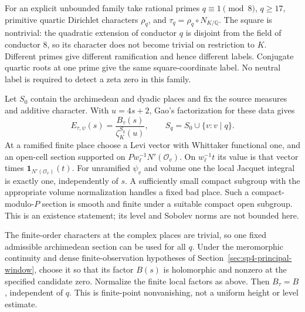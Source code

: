 For an explicit unbounded family take rational primes \(q\equiv1\pmod8\),
\(q\ge17\), primitive quartic Dirichlet characters \(\rho_q\), and
\(\tau_q=\rho_q\circ N_{K/\mathbb Q}\). The square is nontrivial:
the quadratic extension of conductor \(q\) is disjoint from the field
of conductor \(8\), so its character does not become trivial on
restriction to \(K\). Different primes give different ramification
and hence different labels. Conjugate quartic roots at one prime
give the same square-coordinate label. No neutral label is required
to detect a zeta zero in this family.

Let \(S_0\) contain the archimedean and dyadic places and fix the
source measures and additive character. With \(u=4s+2\), Gao's
factorization for these data gives
\[
 E_{\tau,\psi}(s)=\frac{B_\tau(s)}{\zeta_K^{S_q}(u)},
 \qquad S_q=S_0\cup\{v:v\mid q\}.
\]
At a ramified finite place choose a Levi vector with Whittaker
functional one, and an open-cell section supported on
\(P w_\ell^{-1}N'(\mathcal O_v)\). On \(w_\ell^{-1}t\) its value
is that vector times \(\mathbf1_{N'(\mathcal O_v)}(t)\).
For unramified \(\psi_v\) and volume one the local Jacquet integral
is exactly one, independently of \(s\). A sufficiently small compact
subgroup with the appropriate volume normalization handles a fixed
bad place. Such a compact-modulo-\(P\) section is smooth and finite
under a suitable compact open subgroup. This is an existence
statement; its level and Sobolev norms are not bounded here.

The finite-order characters at the complex places are trivial, so
one fixed admissible archimedean section can be used for all \(q\).
Under the meromorphic continuity and dense finite-observation
hypotheses of Section~\ref{sec:sp4-principal-window}, choose it so
that its factor \(B(s)\) is holomorphic and nonzero at the specified
candidate zero. Normalize the finite local factors as above. Then
\(B_\tau=B\), independent of \(q\). This is finite-point
nonvanishing, not a uniform height or level estimate.

